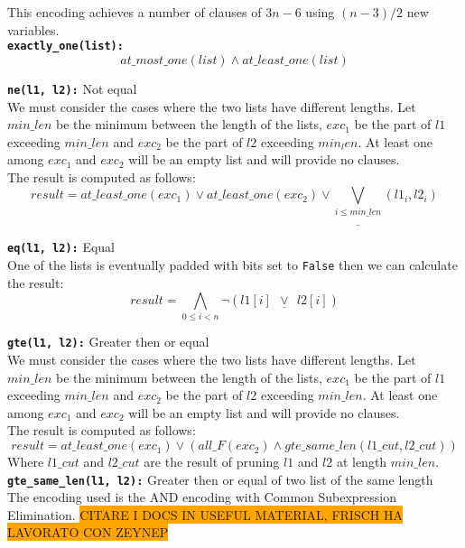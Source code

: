 This encoding achieves a number of clauses of $3n - 6$ using $(n-3)/2$ new variables.
\\

\texttt{\textbf{exactly\_one(list):}}
\begin{equation}
    at\_most\_one(list) \wedge at\_least\_one(list)
\end{equation}


\texttt{\textbf{ne(l1, l2):}} Not equal\\
We must consider the cases where the two lists have different lengths.
Let $min\_len$ be the minimum between the length of the lists, $exc_1$ be the part of $l1$
 exceeding $min\_len$ and $exc_2$ be the part of $l2$ exceeding $min_len$. At least one 
among $exc_1$ and $exc_2$ will be an empty list and will provide no clauses.\\
The result is computed as follows:
\begin{equation}
    result = at\_least\_one(exc_1) \vee at\_least\_one(exc_2) \vee \underline{\bigvee\limits_{i \leq min\_len}}(l1_i, l2_i)
\end{equation}

\texttt{\textbf{eq(l1, l2):}} Equal\\
One of the lists is eventually padded with bits set to \texttt{False} then we can
calculate the result:
\begin{equation}
    result = \bigwedge\limits_{0 \leq i < n} \neg (l1[i]      \ \ \underline\vee\ \ l2[i] )
\end{equation}


\texttt{\textbf{gte(l1, l2):}} Greater then or equal\\
We must consider the cases where the two lists have different lengths.
Let $min\_len$ be the minimum between the length of the lists, $exc_1$ be the part of $l1$ 
exceeding $min\_len$ and $exc_2$ be the part of $l2$ exceeding $min\_len$. At least one among
$exc_1$ and $exc_2$ will be an empty list and will provide no clauses.\\
The result is computed as follows:
\begin{equation}
    result = at\_least\_one(exc_1) \vee ( all\_F(exc_2) \wedge gte\_same\_len(l1\_cut, l2\_cut))
\end{equation}
Where $l1\_cut$ and $l2\_cut$ are the result of pruning $l1$ and $l2$ at length $min\_len$.\\

\texttt{\textbf{gte\_same\_len(l1, l2):}} Greater then or equal of two list of the same length\\
The encoding used is the AND encoding with Common Subexpression Elimination. \colorbox{orange}
{CITARE I DOCS IN USEFUL MATERIAL, FRISCH HA LAVORATO CON ZEYNEP}


